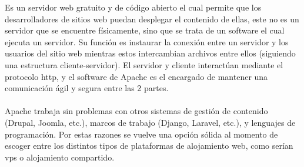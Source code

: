 \documentclass[12pt, a4paper, titlepage]{report}
\begin{document}
	 	Es un servidor web gratuito y de código abierto el cual permite que los desarrolladores de sitios web puedan desplegar el contenido de ellas, este no es un servidor que se encuentre físicamente, sino que se trata de un software el cual ejecuta un servidor. Su función es instaurar la conexión entre un servidor y los usuarios del sitio web mientras estos intercambian archivos entre ellos (siguiendo una estructura cliente-servidor). El servidor y cliente interactúan mediante el protocolo \acrshort{http}, y el software de Apache es el encargado de mantener una comunicación ágil y segura entre las 2 partes.\cite{Apache}\\\\
	 	Apache trabaja sin problemas con otros sistemas de gestión de contenido (Drupal, Joomla, etc.), marcos de trabajo (Django, Laravel, etc.), y lenguajes de programación. Por estas razones se vuelve una opción sólida al momento de escoger entre los distintos tipos de plataformas de alojamiento web, como serían \acrfull{vps} o alojamiento compartido.\cite{what_is_apache}\\

		\newpage
			
\end{document}

